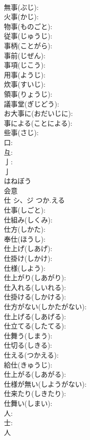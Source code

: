 \documentclass[8pt]{extreport}
\begin{document}
\begin{CJK}{UTF8}{min}
\\	無事(ぶじ): 
\\	火事(かじ): 
\\	物事(ものごと): 
\\	従事(じゅうじ): 
\\	事柄(ことがら): 
\\	事前(じぜん): 
\\	事項(じこう): 
\\	用事(ようじ): 
\\	炊事(すいじ): 
\\	領事(りょうじ): 
\\	議事堂(ぎじどう): 
\\	お大事に(おだいじに): 
\\	事による(ことによる): 
\\	些事(さじ): 
\\	口: 
\\	彑: 
\\	亅: 
\\	亅	
\\	はねぼう	
\\	会意 
\\	仕	シ、ジ	つか.える		
\\	仕事(しごと): 
\\	仕組み(しくみ): 
\\	仕方(しかた): 
\\	奉仕(ほうし): 
\\	仕上げ(しあげ): 
\\	仕掛け(しかけ): 
\\	仕様(しよう): 
\\	仕上がり(しあがり): 
\\	仕入れる(しいれる): 
\\	仕掛ける(しかける): 
\\	仕方がない(しかたがない): 
\\	仕上げる(しあげる): 
\\	仕立てる(したてる): 
\\	仕舞う(しまう): 
\\	仕切る(しきる): 
\\	仕える(つかえる): 
\\	給仕(きゅうじ): 
\\	仕上がる(しあがる): 
\\	仕様が無い(しようがない): 
\\	仕来たり(しきたり): 
\\	仕舞い(しまい): 
\\	人: 
\\	士: 
\\	人	

\end{CJK}
\end{document}
